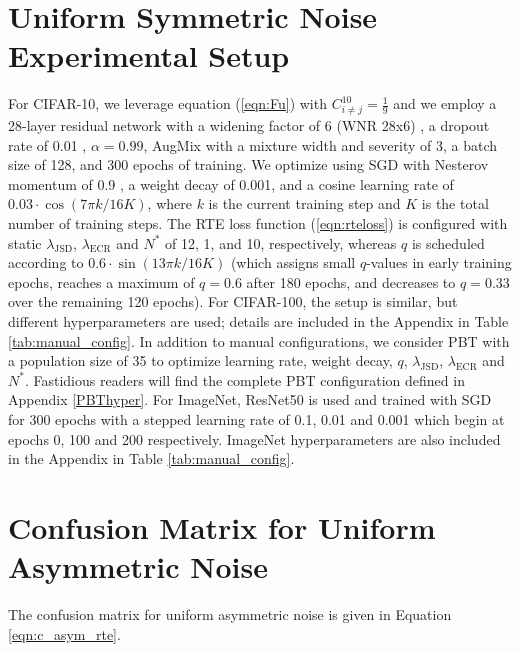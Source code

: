 \documentclass{article}
\DeclareMathOperator{\ECR}{ECR}
\DeclareMathOperator{\JSD}{JSD}
\begin{document}
\section{Uniform Symmetric Noise Experimental Setup}
\label{appendix:uniformsetup}

For CIFAR-10, we leverage equation (\ref{eqn:Fu}) with $C^{10}_{i\neq j} = \frac{1}{9}$ and we employ a 28-layer residual network \cite{He_2016_CVPR} with a widening factor of 6 (WNR 28x6) \cite{2016arXiv160507146Z}, a dropout rate of 0.01 \cite{JMLR:v15:srivastava14a}, $\alpha = 0.99$, AugMix with a mixture width and severity of 3, a batch size of 128, and 300 epochs of training. We optimize using SGD with Nesterov momentum of 0.9 \cite{nesterov}, a weight decay of 0.001, and a cosine learning rate \cite{sgdr2017:} of $0.03 \cdot \cos(7\pi k / 16K)$, where $k$ is the current training step and $K$ is the total number of training steps. The RTE loss function (\ref{eqn:rteloss}) is configured with static $\lambda_{\JSD}$, $\lambda_{\ECR}$ and $N^*$ of 12, 1, and 10, respectively, whereas $q$ is scheduled according to $0.6\cdot \sin(13\pi k/16K)$ (which assigns small $q$-values in early training epochs, reaches a maximum of $q=0.6$ after 180 epochs, and decreases to $q=0.33$ over the remaining 120 epochs). For CIFAR-100, the setup is similar, but different hyperparameters are used; details are included in the Appendix in Table \ref{tab:manual_config}. In addition to manual configurations, we consider PBT with a population size of 35 to optimize learning rate, weight decay, $q$, $\lambda_{\JSD}$, $\lambda_{\ECR}$ and $N^*$.  Fastidious readers will find the complete PBT configuration defined in Appendix \ref{PBThyper}. For ImageNet, ResNet50 is used and trained with SGD for 300 epochs with a stepped learning rate of 0.1, 0.01 and 0.001 which begin at epochs 0, 100 and 200 respectively. ImageNet hyperparameters are also included in the Appendix in Table \ref{tab:manual_config}.



\section{Confusion Matrix for Uniform Asymmetric Noise}
\label{appendix:asymsetup}

The confusion matrix for uniform asymmetric noise is given in Equation \ref{eqn:c_asym_rte}.
\end{document}
